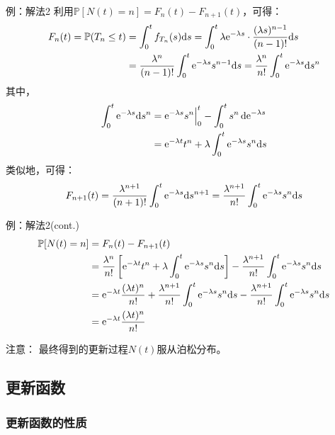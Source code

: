 \documentclass[t]{beamer}
\renewcommand{\Pr}{\mathbb{P}}
\begin{document}
\begin{frame}{例：解法2}
利用$ \Pr[N(t)=n]=F_{n}(t)-F_{n+1}(t)$，可得：
\[\begin{split}
  F_n(t)=\Pr(T_n\le t) &= \int^t_0 f_{T_n}(s)\dd s=\int^t_0 \lambda {\rm e}^{-\lambda s}\cdot\frac{(\lambda s)^{n-1}}{(n-1)!} \dd s\\
  &=\frac{\lambda^n}{(n-1)!}\int^t_0 {\rm e}^{-\lambda s}s^{n-1}\dd s = \frac{\lambda^n}{n!}\int^t_0 {\rm e}^{-\lambda s}\dd s^n\\
\end{split}\]
其中，
\[\begin{split}
  \int^t_0 {\rm e}^{-\lambda s}\dd s^n &= {\rm e}^{-\lambda s}s^n\Big|^t_0 -\int^t_0 s^n\dd {\rm e}^{-\lambda s} \\
  &={\rm e}^{-\lambda t}t^n +\lambda \int^t_0 {\rm e}^{-\lambda s}s^n  \dd s
\end{split}\]
类似地，可得：
\[F_{n+1}(t)=\frac{\lambda^{n+1}}{(n+1)!}\int^t_0 {\rm e}^{-\lambda s}\dd s^{n+1}=\frac{\lambda^{n+1}}{n!}\int^t_0 {\rm e}^{-\lambda s}s^n\dd s\]


\end{frame}

\begin{frame}{例：解法2(cont.)}
\[\begin{split}
  \Pr[N(t)=n]&=F_{n}(t)-F_{n+1}(t)\\
  &=\frac{\lambda^n}{n!}\left[{\rm e}^{-\lambda t}t^n +\lambda \int^t_0 {\rm e}^{-\lambda s}s^n  \dd s\right]-\frac{\lambda^{n+1}}{n!}\int^t_0 {\rm e}^{-\lambda s}s^n\dd s\\
  &= {\rm e}^{-\lambda t}\frac{(\lambda t)^n}{n!}+\frac{\lambda^{n+1}}{n!}\int^t_0 {\rm e}^{-\lambda s}s^n\dd s-\frac{\lambda^{n+1}}{n!}\int^t_0 {\rm e}^{-\lambda s}s^n\dd s\\
  &= {\rm e}^{-\lambda t}\frac{(\lambda t)^n}{n!}
\end{split}\]

\begin{block}{注意：}
  最终得到的更新过程$N (t)$服从泊松分布。
\end{block}
\end{frame}





\subsection{更新函数}

\subsubsection{更新函数的性质}
\end{document}
